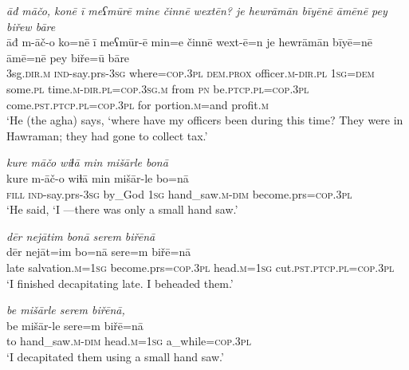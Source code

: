 \ea \label{BP.57}
\textit{āđ māčo, konē ī meʕmūrē mine činnē wextēn? je hewrāmān bīyēnē āmēnē pey biřew bāre} \\ 
\gll āđ m-āč-o ko=nē ī meʕmūr-ē min=e činnē wext-ē=n je hewrāmān bīyē=nē āmē=nē pey biře=ū bāre \\ 
 3sg\textsc{.dir}\textsc{.m} \textsc{ind-}say.prs\textsc{-3sg} where\textsc{=cop}\textsc{.3pl} \textsc{dem.prox} officer\textsc{.m}\textsc{-dir}\textsc{.pl} \textsc{1sg}\textsc{=dem} some\textsc{.pl} time\textsc{.m}\textsc{-dir}\textsc{.pl}\textsc{=cop}\textsc{.3sg}\textsc{.m} from \textsc{pn} be\textsc{.ptcp}\textsc{.pl}\textsc{=cop}\textsc{.3pl} come\textsc{.pst}\textsc{.ptcp}\textsc{.pl}\textsc{=cop}\textsc{.3pl} for portion\textsc{.m}=and profit\textsc{.m} \\ 
\glt `He (the agha) says, ‘where have my officers been during this time? They were in Hawraman; they had gone to collect tax.'
\z 
 
\ea \label{BP.82}
\textit{kure māčo wiɫā min mišārle bonā} \\ 
\gll kure m-āč-o wiɫā min mišār-le bo=nā \\ 
 \textsc{fill} \textsc{ind-}say.prs\textsc{-3sg} by\_God \textsc{1sg} hand\_saw\textsc{.m}\textsc{-dim} become.prs\textsc{=cop}\textsc{.3pl} \\ 
\glt `He said, ‘I —there was only a small hand saw.'
\z 
 
\ea \label{BP.83}
\textit{dēr nejātim bonā serem biřēnā} \\ 
\gll dēr nejāt=im bo=nā sere=m biřē=nā \\ 
 late salvation\textsc{.m}\textsc{=\textsc{1sg}} become.prs\textsc{=cop}\textsc{.3pl} head\textsc{.m}\textsc{=\textsc{1sg}} cut\textsc{.pst}\textsc{.ptcp}\textsc{.pl}\textsc{=cop}\textsc{.3pl} \\ 
\glt `I finished decapitating late. I beheaded them.'
\z 
 
\ea \label{BP.84}
\textit{be mišārle serem biřēnā,} \\ 
\gll be mišār-le sere=m biřē=nā \\ 
 to hand\_saw\textsc{.m}\textsc{-dim} head\textsc{.m}\textsc{=\textsc{1sg}} a\_while\textsc{=cop}\textsc{.3pl} \\ 
\glt `I decapitated them using a small hand saw.'
\z 
 
